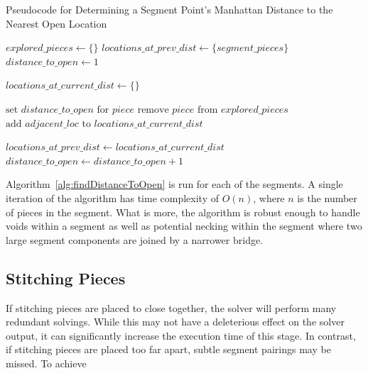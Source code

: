 \begin{algorithm}
\caption{Pseudocode for Determining a Segment Point's Manhattan Distance to the Nearest Open Location}\label{alg:findDistanceToOpen}
\begin{algorithmic}[1]
    \State $\textit{explored\_pieces} \gets \{ \}$
    \State $\textit{locations\_at\_prev\_dist} \gets \{ \textit{segment\_pieces} \}$
    \State $\textit{distance\_to\_open} \gets 1$
\item[]
        \State $\textit{locations\_at\_current\_dist} \gets \{ \}$
\item[]
        		
        			\State $\text{set } \textit{distance\_to\_open} \text{ for } \textit{piece}$
        			\State $\text{remove } \textit{piece} \text{ from } \textit{explored\_pieces}$
        			\State $\text{add } \textit{adjacent\_loc} \text{ to } \textit{locations\_at\_current\_dist}$
        		\EndIf
        	\EndFor
        \EndFor
\item[]
    \State $\textit{locations\_at\_prev\_dist} \gets locations\_at\_current\_dist$
    \State $\textit{distance\_to\_open} \gets \textit{distance\_to\_open} + 1$
    \EndWhile
\EndProcedure
\end{algorithmic}
\end{algorithm}

Algorithm~\ref{alg:findDistanceToOpen} is run for each of the segments.  A single iteration of the algorithm has time complexity of $O(n)$, where $n$ is the number of pieces in the segment.  What is more, the algorithm is robust enough to handle voids within a segment as well as potential necking within the segment where two large segment components are joined by a narrower bridge.

\subsection{Stitching Pieces}

If stitching pieces are placed to close together, the solver will perform many redundant solvings.  While this may not have a deleterious effect on the solver output, it can significantly increase the execution time of this stage.  In contrast, if stitching pieces are placed too far apart, subtle segment pairings may be missed.  To achieve 

